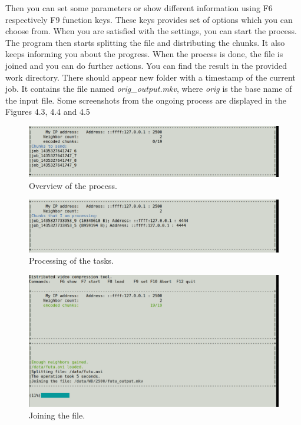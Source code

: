 Then you can set some parameters or show different information using F6 respectively F9 function keys. These keys provides set of options which you can choose from. When you are satisfied with the settings, you can start the process.
The program then starts splitting the file and distributing the chunks. It also keeps informing you about the progress. When the process is done, the file is joined and you can do further actions. You can find the result in the provided work directory. There should appear new folder with a timestamp of the current job. It contains the file named \textit{orig\_output.mkv}, where \textit{orig} is the base name of the input file. Some screenshots from the ongoing process are displayed in the Figures 4.3, 4.4 and 4.5
\begin{figure}[h]
\begin{center}
\includegraphics[scale=0.30]{./img/process-initiator.pdf}
\caption{Overview of the process.}
\end{center}
\end{figure}
\begin{figure}[h]
\begin{center}
\includegraphics[scale=0.30]{./img/processing.pdf}
\caption{Processing of the tasks.}
\end{center}
\end{figure}
\begin{figure}[h]
\begin{center}
\includegraphics[scale=0.30]{./img/joining.pdf}
\caption{Joining the file.}
\end{center}
\end{figure}

